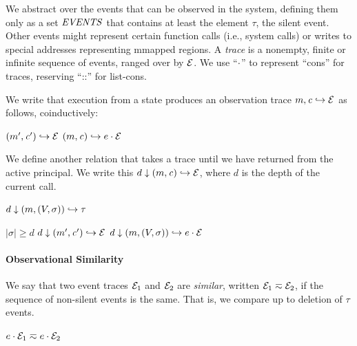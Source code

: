 \documentclass[10pt,conference]{ieeetran}%
\theoremstyle{definition}
\begin{document}
We abstract over the events that can be observed in the system, defining them
only as a set \(\mathit{EVENTS}\) that contains at least the element \(\tau\), the silent
event. Other events might represent certain function calls (i.e., system calls)
or writes to special addresses representing mmapped regions.
A {\em trace} is a nonempty, finite or infinite sequence
of events, ranged over by \(\mathcal{E}\).
We use ``\(\cdot\)'' to represent ``cons'' for traces, reserving ``::''
for list-cons.

We write that execution from a state produces an observation trace
\(m,\mathit{c} \hookrightarrow \mathcal{E}\) as follows, coinductively:

            {\((m',\mathit{c}') \hookrightarrow \mathcal{E}\)}
            {\((m,\mathit{c}) \hookrightarrow e \cdot \mathcal{E}\)}

We define another relation that takes a trace until we have returned from the
active principal.
We write this \(d \downarrow (m,\mathit{c}) \hookrightarrow \mathcal{E}\), where
\(d\) is the depth of the current call.

         {\(d \downarrow (m,(V,\sigma)) \hookrightarrow \tau\)}

                  {\(|\sigma| \geq d\)}
                  {\(d \downarrow (m',\mathit{c}') \hookrightarrow \mathcal{E}\)}
                  {\(d \downarrow (m,(V,\sigma)) \hookrightarrow e \cdot \mathcal{E}\)}

\paragraph*{Observational Similarity}

We say that two event traces $\mathcal{E}_1$ and $\mathcal{E}_2$ are {\em similar},
written \(\mathcal{E}_1 \eqsim \mathcal{E}_2\), if the sequence of non-silent events
is the same. That is, we compare up to deletion of \(\tau\) events.

\begin{minipage}{.4\columnwidth}
  \judgment{}{\(\obsT \eqsim \obsT\)}
\end{minipage}
\begin{minipage}{.4\columnwidth}
           {\(e \cdot \mathcal{E}_1 \eqsim e \cdot \mathcal{E}_2\)}
\end{minipage}
\end{document}
